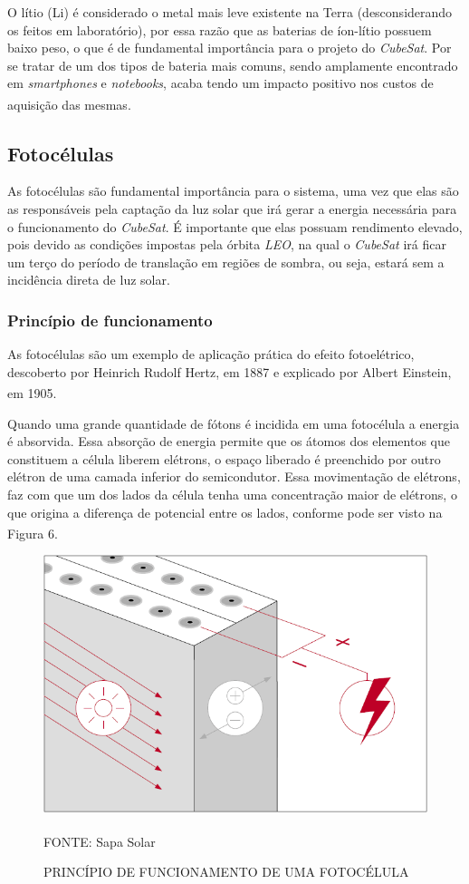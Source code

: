 \documentclass[
	12pt,				%
	openright,			%
	oneside,			%
	a4paper,			%
	english,			%
	french,				%
	spanish,			%
	brazil,				%
	oldfontcommands
	]{abntex2}
\begin{document}
	O lítio (Li) é considerado o metal mais leve existente na Terra (desconsiderando os feitos em laboratório), por essa razão que as baterias de íon-lítio possuem baixo peso, o que é de fundamental importância para o projeto do \textit{CubeSat}. Por se tratar de um dos tipos de bateria mais comuns, sendo amplamente encontrado em \textit{smartphones} e \textit{notebooks}, acaba tendo um impacto positivo nos custos de aquisição das mesmas.\textsuperscript{\cite{TecMundo}}
	
\subsection[Fotocélulas]{Fotocélulas}

	As fotocélulas são fundamental importância para o sistema, uma vez que elas são as responsáveis pela captação da luz solar que irá gerar a energia necessária para o funcionamento do \textit{CubeSat}. É importante que elas possuam rendimento elevado, pois devido as condições impostas pela órbita \textit{LEO}, na qual o \textit{CubeSat} irá ficar um terço do período de translação em regiões de sombra, ou seja, estará sem a incidência direta de luz solar.
	
\subsubsection[Princípio de funcionamento]{Princípio de funcionamento}

	As fotocélulas são um exemplo de aplicação prática do efeito fotoelétrico, descoberto por Heinrich Rudolf Hertz, em 1887 e explicado por Albert Einstein, em 1905.\textsuperscript{\cite{celula}}
	
	Quando uma grande quantidade de fótons é incidida em uma fotocélula a energia é absorvida. Essa absorção de energia permite que os átomos dos elementos que constituem a célula liberem elétrons, o espaço liberado é preenchido por outro elétron de uma camada inferior do semicondutor. Essa movimentação de elétrons, faz com que um dos lados da célula tenha uma concentração maior de elétrons, o que origina a diferença de potencial entre os lados, conforme pode ser visto na Figura 6.\textsuperscript{\cite{celula2}}
	
	\begin{figure}[th]
		\caption{PRINCÍPIO DE FUNCIONAMENTO DE UMA FOTOCÉLULA}
		\centering
		\includegraphics[width=0.6\linewidth]{./figs/fotocelula}
			
		\begin{small}
			FONTE: Sapa Solar\textsuperscript{\cite{celula2}}
		\end{small}		
	\end{figure}
\end{document}
